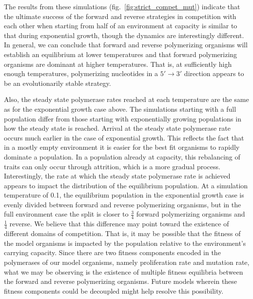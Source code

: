 The results from these simulations (fig.~\ref{fig:strict_compet_mut}) indicate that the ultimate success of the forward and reverse strategies in competition with each other when starting from half of an environment at capacity is similar to that during exponential growth, though the dynamics are interestingly different. In general, we can conclude that forward and reverse polymerizing organisms will establish an equilibrium at lower temperatures and that forward polymerizing organisms are dominant at higher temperatures. That is, at sufficiently high enough temperatures, polymerizing nucleotides in a $5'\to3'$ direction appears to be an evolutionarily stable strategy.

Also, the steady state polymerase rates reached at each temperature are the same as for the exponential growth case above. The simulations starting with a full population differ from those starting with exponentially growing populations in how the steady state is reached. Arrival at the steady state polymerase rate occurs much earlier in the case of exponential growth. This reflects the fact that in a mostly empty environment it is easier for the best fit organisms to rapidly dominate a population. In a population already at capacity, this rebalancing of traits can only occur through attrition, which is a more gradual process. Interestingly, the rate at which the steady state polymerase rate is achieved appears to impact the distribution of the equilibrium population. At a simulation temperature of 0.1, the equilibrium population in the exponential growth case is evenly divided between forward and reverse polymerizing organisms, but in the full environment case the split is closer to $\frac{3}{4}$ forward polymerizing organisms and $\frac{1}{4}$ reverse. We believe that this difference may point toward the existence of different domains of competition. That is, it may be possible that the fitness of the model organisms is impacted by the population relative to the environment's carrying capacity. Since there are two fitness components encoded in the polymerases of our model organisms, namely proliferation rate and mutation rate, what we may be observing is the existence of multiple fitness equilibria between the forward and reverse polymerizing organisms. Future models wherein these fitness components could be decoupled might help resolve this possibility.


